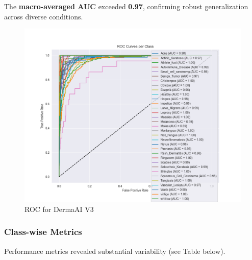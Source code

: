 \documentclass[
  12pt,
  oneside]{article}
\begin{document}
The \textbf{macro-averaged AUC} exceeded \textbf{0.97}, confirming
robust generalization across diverse conditions.

\begin{figure}

{\centering \includegraphics[width=0.8\linewidth]{roc_curves} 

}

\caption{ROC for DermaAI V3}\label{fig:unnamed-chunk-20}
\end{figure}

\subsubsection{Class-wise Metrics}\label{class-wise-metrics}

Performance metrics revealed substantial variability (see Table below).
\end{document}
